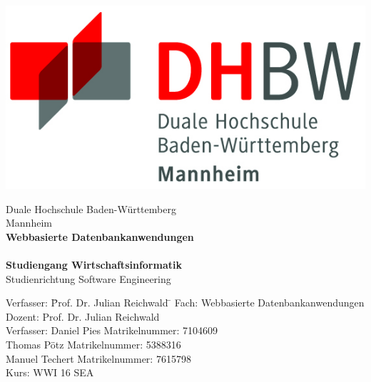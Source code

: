 \begin{titlepage}
\begin{minipage}{\textwidth}
		\vspace{-2cm}
		\hfill   \includegraphics{img/logo.jpg}
\end{minipage}
\vspace{1em}
\sffamily
\begin{center}
	\textsf{\large{}Duale Hochschule Baden-W\"urttemberg\\[1.5mm] Mannheim}\\[4em]
	\textsf{\textbf{\Large{}Webbasierte Datenbankanwendungen}}\\[3mm]
	\textsf{\textbf{\Large{}\DerTitelDerArbeit}} \\[3cm]
	\textsf{\textbf{\Large{}Studiengang Wirtschaftsinformatik}\\[3mm] \textsf{Studienrichtung Software Engineering}}	
	\vspace{3em}	
	\vfill

\begin{minipage}{\textwidth}

\begin{tabbing}
	Verfasser: \hspace{0.85cm} \= Prof. Dr. Julian Reichwald \hspace{0.85cm} \= \kill
	Fach: 		\> Webbasierte Datenbankanwendungen      \> \\[1.5mm]
	Dozent:		\> Prof. Dr. Julian Reichwald  \> \\[3mm]
	Verfasser:  \> Daniel Pies     \> Matrikelnummer: 7104609\\[1.5mm]
				\> Thomas Pötz   \> Matrikelnummer: 5388316\\[1.5mm]
				\> Manuel Techert  \> Matrikelnummer: 7615798\\[3mm]
	Kurs:		\> WWI 16 SEA      \> \\


\end{tabbing}

\end{minipage}

\end{center}

\end{titlepage}